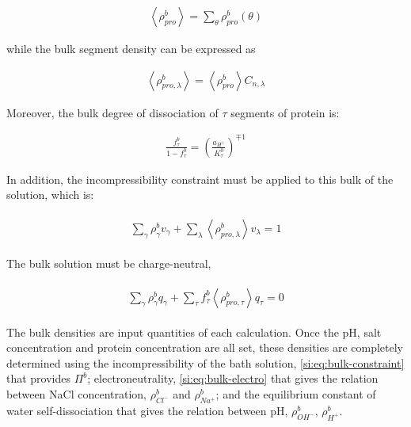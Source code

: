\documentclass[journal=jacsat,manuscript=suppinfo]{achemso}
\begin{document}
\begin{align}
	\left<\rho^b_{pro}\right> = \sum_{\theta}\rho^b_{pro}(\theta) 
\end{align}

while the bulk segment density can be expressed as


\begin{align}
	\left<\rho^b_{pro,\lambda}\right> =  \left<\rho^b_{pro}\right> C_{n,\lambda}
	\label{eq:segments_pro_si}
\end{align}






Moreover, the bulk degree of dissociation  of $\tau$ segments of protein is:

\begin{align}
	\frac{f_\tau^b}{1-f_\tau^b} = \left(\frac{a_{H^+}}{K^0_{\tau}}\right)^{\mp 1}
\end{align}







In addition, the  incompressibility constraint must be applied to this bulk of the solution, which is:

\begin{align}
	\begin{aligned}
		{\sum_{\gamma}\rho^b_\gamma v_\gamma + \sum_\lambda{\left<\rho^b_{pro,\lambda}\right>v_\lambda} } =1
	\end{aligned}
	\label{si:eq:bulk-constraint}
\end{align}



The bulk solution must  be charge-neutral,

\begin{align}
	\begin{aligned}
		{\sum_{\gamma}\rho^b_\gamma q_\gamma + \sum_\tau{f_\tau^b \left<\rho^b_{pro,\tau}\right>q_\tau} } =0
	\end{aligned}
	\label{si:eq:bulk-electro}
\end{align}






The bulk densities are  input quantities  of each calculation.
Once the pH, salt concentration and protein concentration are all set, these densities are completely determined using the incompressibility of the bath solution, \cref{si:eq:bulk-constraint} that provides $\Pi^b$; electroneutrality, \cref{si:eq:bulk-electro} that gives the relation between NaCl concentration, $\rho_{Cl^-}^b$ and $\rho_{Na^+}^b$;  and the equilibrium constant of water self-dissociation that gives the relation between pH, $\rho_{OH^-}^b$, $\rho_{H^+}^b$.
\end{document}
